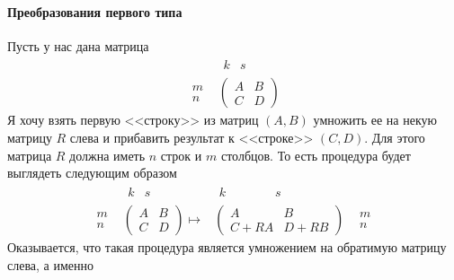 \paragraph{Преобразования первого типа}

Пусть у нас дана матрица
\[
\begin{matrix}
{}&{
\begin{matrix}
{k}&{s}
\end{matrix}}\\
{
\begin{matrix}
{m}\\
{n}
\end{matrix}}&{
\begin{pmatrix}
{A}&{B}\\
{C}&{D}
\end{pmatrix}}
\end{matrix}
\]
Я хочу взять первую <<строку>> из матриц $(A, B)$ умножить ее на некую матрицу $R$ слева и прибавить результат к <<строке>> $(C, D)$.
Для этого матрица $R$ должна иметь $n$ строк и $m$ столбцов.
То есть процедура будет выглядеть следующим образом
\[
\begin{matrix}
{}&{
\begin{matrix}
{k}&{s\phantom{dd}}
\end{matrix}}\\
{
\begin{matrix}
{m}\\
{n}
\end{matrix}}&{
\begin{pmatrix}
{A}&{B}\\
{C}&{D}
\end{pmatrix}\mapsto}
\end{matrix}
\begin{matrix}
{
\begin{matrix}
{k\phantom{dddddd}}&{s}
\end{matrix}
}&{
}\\
{
\begin{pmatrix}
{A}&{B}\\
{C+RA}&{D+RB}
\end{pmatrix}
}&{
\begin{matrix}
{m}\\
{n}
\end{matrix}
}
\end{matrix}
\]
Оказывается, что такая процедура является умножением на обратимую матрицу слева, а именно
